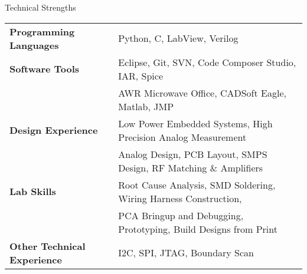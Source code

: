 \documentclass{resume} %
\begin{document}

\begin{rSection}{Technical Strengths}

\begin{tabular}{ @{} >{\bfseries}l @{\hspace{6ex}} l }
Programming Languages & Python, C, LabView, Verilog \smallskip \\

Software Tools & Eclipse, Git, SVN, Code Composer Studio, IAR, Spice\\ 
 & AWR Microwave Office, CADSoft Eagle, Matlab, JMP \smallskip \\

Design Experience & Low Power Embedded Systems, High Precision Analog Measurement \\ 
 & Analog Design, PCB Layout, SMPS Design, RF Matching \& Amplifiers \smallskip \\
 
Lab Skills & Root Cause Analysis, SMD Soldering, Wiring Harness Construction,\\
 & PCA Bringup and Debugging, Prototyping, Build Designs from Print\smallskip \\
 
Other Technical Experience & I2C, SPI, JTAG, Boundary Scan \\
\end{tabular}

\end{rSection}
\end{document}
